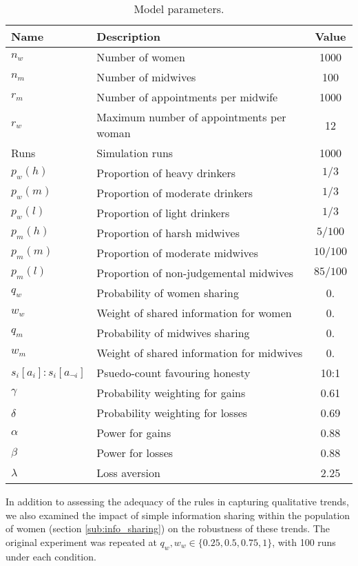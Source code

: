 \begin{table}[h!]
\center
\begin{tabular} {|l | l | c|}
\hline
Name & Description & Value \\ \hline
\(n_{w}\) & Number of women & 1000 \\ \hline
\(n_{m}\) & Number of midwives & 100 \\ \hline
\(r_{m}\) & Number of appointments per midwife & 1000 \\ \hline
\(r_{w}\) & Maximum number of appointments per woman & 12 \\ \hline
Runs & Simulation runs & 1000 \\ \hline
\(p_{w}(h)\) & Proportion of heavy drinkers & \(1/3\) \\ \hline
\(p_{w}(m)\) & Proportion of moderate drinkers & \(1/3\) \\ \hline
\(p_{w}(l)\) & Proportion of light drinkers & \(1/3\) \\ \hline
\(p_{m}(h)\) & Proportion of harsh midwives & \(5/100\) \\ \hline
\(p_{m}(m)\) & Proportion of moderate midwives & \(10/100\) \\ \hline
\(p_{m}(l)\) & Proportion of non-judgemental midwives & \(85/100\) \\ \hline
\(q_{w}\) & Probability of women sharing & 0. \\ \hline
\(w_{w}\) & Weight of shared information for women & 0. \\ \hline
\(q_{m}\) & Probability of midwives sharing & 0. \\ \hline
\(w_{m}\) & Weight of shared information for midwives & 0. \\ \hline
\(s_{i}[a_{i}]:s_{i}[a_{\neg i}]\) & Psuedo-count favouring honesty & 10:1 \\ \hline
\(\gamma\) & Probability weighting for gains  & 0.61 \\ \hline
\(\delta\) & Probability weighting for losses &  0.69\\ \hline
\(\alpha\) & Power for gains  & 0.88 \\ \hline
\(\beta\) & Power for losses & 0.88 \\ \hline
\(\lambda\) & Loss aversion &  2.25 \\ \hline
\end{tabular}
\caption[Table caption text]{Model parameters. \label{tab:qt_params}}
\end{table}


In addition to assessing the adequacy of the rules in capturing qualitative trends, we also examined the impact of simple information sharing within the population of women (section \ref{sub:info_sharing}) on the robustness of these trends. The original experiment was repeated at \(q_{w},w_{w}\in \{0.25, 0.5, 0.75, 1\}\), with 100 runs under each condition. 

